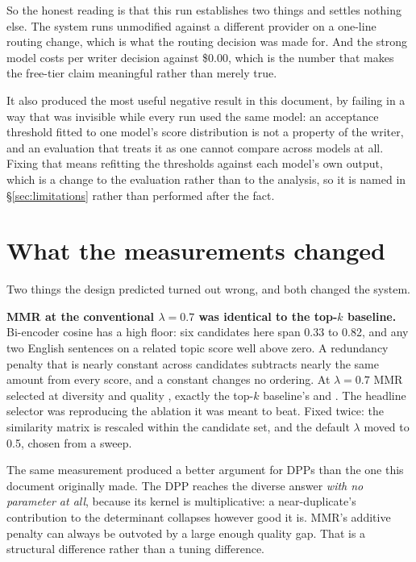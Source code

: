 \documentclass{article}
\begin{document}
So the honest reading is that this run establishes two things and settles nothing else. The
system runs unmodified against a different provider on a one-line routing change, which is
what the routing decision was made for. And the strong model costs
\rMeteredUsdPerDecision{} per writer decision against \$0.00, which is the number that makes
the free-tier claim meaningful rather than merely true.

It also produced the most useful negative result in this document, by failing in a way that
was invisible while every run used the same model: an acceptance threshold fitted to one
model's score distribution is not a property of the writer, and an evaluation that treats it
as one cannot compare across models at all. Fixing that means refitting the thresholds against
each model's own output, which is a change to the evaluation rather than to the analysis, so
it is named in \S\ref{sec:limitations} rather than performed after the fact.

\section{What the measurements changed}
\label{sec:findings}

Two things the design predicted turned out wrong, and both changed the system.

\textbf{MMR at the conventional $\lambda = 0.7$ was identical to the top-$k$ baseline.}
Bi-encoder cosine has a high floor: six candidates here span 0.33 to 0.82, and any two
English sentences on a related topic score well above zero. A redundancy penalty that is
nearly constant across candidates subtracts nearly the same amount from every score, and a
constant changes no ordering. At $\lambda = 0.7$ MMR selected at diversity
\rMmrConventionalDiversity{} and quality \rMmrConventionalQuality{}, exactly the top-$k$
baseline's \rDiversityTopK{} and \rQualityTopK{}. The headline selector was reproducing the
ablation it was meant to beat. Fixed twice: the similarity matrix is rescaled within the candidate set, and
the default $\lambda$ moved to 0.5, chosen from a sweep.

The same measurement produced a better argument for DPPs than the one this document
originally made. The DPP reaches the diverse answer \emph{with no parameter at all}, because
its kernel is multiplicative: a near-duplicate's contribution to the determinant collapses
however good it is. MMR's additive penalty can always be outvoted by a large enough quality
gap. That is a structural difference rather than a tuning difference.
\end{document}
